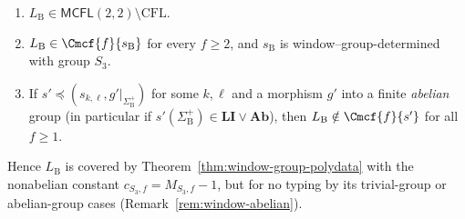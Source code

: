 \begin{proposition}
\label{prop:nonabelian-needed-target}
\begin{enumerate}[label=\textup{(\roman*)},leftmargin=*]
\item $L_{\mathrm B}\in\mathsf{MCFL}(2,2)\setminus\mathrm{CFL}$.
\item $L_{\mathrm B}\in\Cmcf{f}{s_{\mathrm B}}$ for every $f\ge2$, and $s_{\mathrm B}$ is
window--group-determined with group $S_3$.
\item If $s'\preceq(s_{k,\ell},g'|_{\Sigma_{\mathrm B}^+})$ for some $k,\ell$ and a
morphism $g'$ into a finite \emph{abelian} group (in particular if
$s'(\Sigma_{\mathrm B}^+)\in\mathbf{LI}\vee\mathbf{Ab}$), then
$L_{\mathrm B}\notin\Cmcf{f}{s'}$ for all $f\ge1$.
\end{enumerate}
Hence $L_{\mathrm B}$ is covered by Theorem~\ref{thm:window-group-polydata} with the
nonabelian constant $c_{S_3,f}=M_{S_3,f}-1$, but for no typing by its trivial-group or
abelian-group cases (Remark~\ref{rem:window-abelian}).
\end{proposition}

